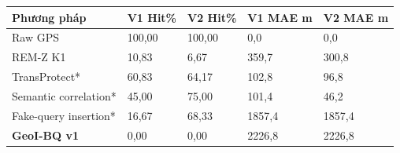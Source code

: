 \par\smallskip\noindent\begin{tabularx}{\linewidth}{@{}P{3.1cm}XXXX@{}}\toprule
\textbf{Phương pháp} & \textbf{V1 Hit\%} & \textbf{V2 Hit\%} & \textbf{V1 MAE m} & \textbf{V2 MAE m} \\
\midrule
Raw GPS & 100{,}00 & 100{,}00 & 0{,}0 & 0{,}0 \\
REM-Z K1 & 10{,}83 & 6{,}67 & 359{,}7 & 300{,}8 \\
TransProtect* & 60{,}83 & 64{,}17 & 102{,}8 & 96{,}8 \\
Semantic correlation* & 45{,}00 & 75{,}00 & 101{,}4 & 46{,}2 \\
Fake-query insertion* & 16{,}67 & 68{,}33 & 1857{,}4 & 1857{,}4 \\
\textbf{GeoI-BQ v1} & 0{,}00 & 0{,}00 & 2226{,}8 & 2226{,}8 \\
\bottomrule\end{tabularx}\par\smallskip
